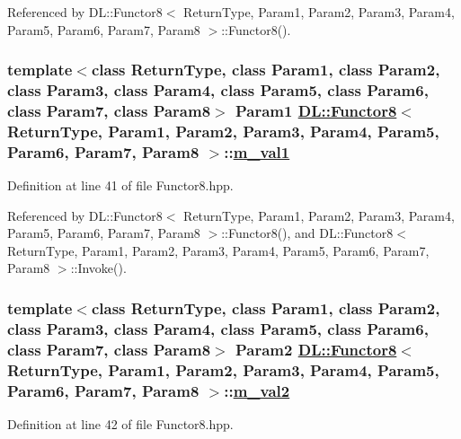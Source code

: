 Referenced by DL::Functor8$<$ Return\-Type, Param1, Param2, Param3, Param4, Param5, Param6, Param7, Param8 $>$::Functor8().\hypertarget{classDL_1_1Functor8_r1}{
\subsubsection[m\_\-val1]{\setlength{\rightskip}{0pt plus 5cm}template$<$class Return\-Type, class Param1, class Param2, class Param3, class Param4, class Param5, class Param6, class Param7, class Param8$>$ Param1 \hyperlink{classDL_1_1Functor8}{DL::Functor8}$<$ Return\-Type, Param1, Param2, Param3, Param4, Param5, Param6, Param7, Param8 $>$::\hyperlink{classDL_1_1Functor8_r1}{m\_\-val1}}}
\label{classDL_1_1Functor8_r1}




Definition at line 41 of file Functor8.hpp.

Referenced by DL::Functor8$<$ Return\-Type, Param1, Param2, Param3, Param4, Param5, Param6, Param7, Param8 $>$::Functor8(), and DL::Functor8$<$ Return\-Type, Param1, Param2, Param3, Param4, Param5, Param6, Param7, Param8 $>$::Invoke().\hypertarget{classDL_1_1Functor8_r2}{
\subsubsection[m\_\-val2]{\setlength{\rightskip}{0pt plus 5cm}template$<$class Return\-Type, class Param1, class Param2, class Param3, class Param4, class Param5, class Param6, class Param7, class Param8$>$ Param2 \hyperlink{classDL_1_1Functor8}{DL::Functor8}$<$ Return\-Type, Param1, Param2, Param3, Param4, Param5, Param6, Param7, Param8 $>$::\hyperlink{classDL_1_1Functor8_r2}{m\_\-val2}}}
\label{classDL_1_1Functor8_r2}




Definition at line 42 of file Functor8.hpp.


